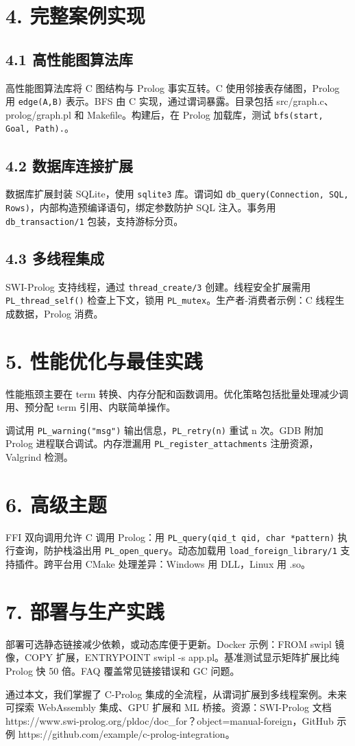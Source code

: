 \chapter{4. 完整案例实现}
\section{4.1 高性能图算法库}
高性能图算法库将 C 图结构与 Prolog 事实互转。C 使用邻接表存储图，Prolog 用 \texttt{edge(A,B)} 表示。BFS 由 C 实现，通过谓词暴露。目录包括 src/graph.c、prolog/graph.pl 和 Makefile。构建后，在 Prolog 加载库，测试 \texttt{bfs(start, Goal, Path).}。\par
\section{4.2 数据库连接扩展}
数据库扩展封装 SQLite，使用 \texttt{sqlite3} 库。谓词如 \texttt{db\_{}query(Connection, SQL, Rows)}，内部构造预编译语句，绑定参数防护 SQL 注入。事务用 \texttt{db\_{}transaction/1} 包装，支持游标分页。\par
\section{4.3 多线程集成}
SWI-Prolog 支持线程，通过 \texttt{thread\_{}create/3} 创建。线程安全扩展需用 \texttt{PL\_{}thread\_{}self()} 检查上下文，锁用 \texttt{PL\_{}mutex}。生产者-消费者示例：C 线程生成数据，Prolog 消费。\par
\chapter{5. 性能优化与最佳实践}
性能瓶颈主要在 term 转换、内存分配和函数调用。优化策略包括批量处理减少调用、预分配 term 引用、内联简单操作。\par
调试用 \texttt{PL\_{}warning("msg")} 输出信息，\texttt{PL\_{}retry(n)} 重试 n 次。GDB 附加 Prolog 进程联合调试。内存泄漏用 \texttt{PL\_{}register\_{}attachments} 注册资源，Valgrind 检测。\par
\chapter{6. 高级主题}
FFI 双向调用允许 C 调用 Prolog：用 \texttt{PL\_{}query(qid\_{}t qid, char *pattern)} 执行查询，防护栈溢出用 \texttt{PL\_{}open\_{}query}。动态加载用 \texttt{load\_{}foreign\_{}library/1} 支持插件。跨平台用 CMake 处理差异：Windows 用 DLL，Linux 用 .so。\par
\chapter{7. 部署与生产实践}
部署可选静态链接减少依赖，或动态库便于更新。Docker 示例：FROM swipl 镜像，COPY 扩展，ENTRYPOINT swipl -s app.pl。基准测试显示矩阵扩展比纯 Prolog 快 50 倍。FAQ 覆盖常见链接错误和 GC 问题。\par
通过本文，我们掌握了 C-Prolog 集成的全流程，从谓词扩展到多线程案例。未来可探索 WebAssembly 集成、GPU 扩展和 ML 桥接。资源：SWI-Prolog 文档 https://www.swi-prolog.org/pldoc/doc\_{}for？object=manual-foreign，GitHub 示例 https://github.com/example/c-prolog-integration。\par
